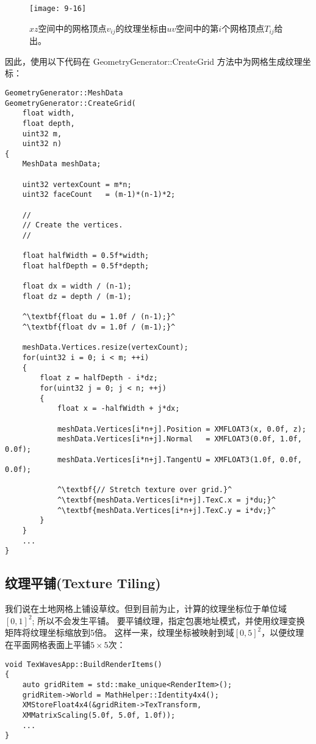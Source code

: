 \begin{figure}[h]
    \label{fig:9-16}
    \texttt{[image: 9-16]}
    \centering
    \caption{$xz$空间中的网格顶点$v_{ij}$的纹理坐标由$uv$空间中的第$i$个网格顶点$T_{ij}$给出。}
\end{figure}

\begin{flushleft}
因此，使用以下代码在 GeometryGenerator::CreateGrid 方法中为网格生成纹理坐标：\\
\end{flushleft}

\begin{lstlisting}[escapechar=^]
GeometryGenerator::MeshData 
GeometryGenerator::CreateGrid(
    float width,
    float depth,
    uint32 m,
    uint32 n)
{
    MeshData meshData;

    uint32 vertexCount = m*n;
    uint32 faceCount   = (m-1)*(n-1)*2;

    //
    // Create the vertices.
    //

    float halfWidth = 0.5f*width;
    float halfDepth = 0.5f*depth;

    float dx = width / (n-1);
    float dz = depth / (m-1);

    ^\textbf{float du = 1.0f / (n-1);}^
    ^\textbf{float dv = 1.0f / (m-1);}^

    meshData.Vertices.resize(vertexCount);
    for(uint32 i = 0; i < m; ++i)
    {
        float z = halfDepth - i*dz;
        for(uint32 j = 0; j < n; ++j)
        {
            float x = -halfWidth + j*dx;

            meshData.Vertices[i*n+j].Position = XMFLOAT3(x, 0.0f, z);
            meshData.Vertices[i*n+j].Normal   = XMFLOAT3(0.0f, 1.0f, 0.0f);
            meshData.Vertices[i*n+j].TangentU = XMFLOAT3(1.0f, 0.0f, 0.0f);

            ^\textbf{// Stretch texture over grid.}^
            ^\textbf{meshData.Vertices[i*n+j].TexC.x = j*du;}^
            ^\textbf{meshData.Vertices[i*n+j].TexC.y = i*dv;}^
        }
    }
    ...
}
\end{lstlisting}

\subsection{纹理平铺(Texture Tiling)}
\begin{flushleft}
我们说在土地网格上铺设草纹。但到目前为止，计算的纹理坐标位于单位域$[0,1]^{2}$; 所以不会发生平铺。 要平铺纹理，指定包裹地址模式，并使用纹理变换矩阵将纹理坐标缩放到5倍。 这样一来，纹理坐标被映射到域$[0,5]^{2}$，以便纹理在平面网格表面上平铺$5\times 5$次：\\
\end{flushleft}
\begin{lstlisting}
void TexWavesApp::BuildRenderItems()
{
    auto gridRitem = std::make_unique<RenderItem>();
    gridRitem->World = MathHelper::Identity4x4();
    XMStoreFloat4x4(&gridRitem->TexTransform,
    XMMatrixScaling(5.0f, 5.0f, 1.0f));
    ...
}
\end{lstlisting}

